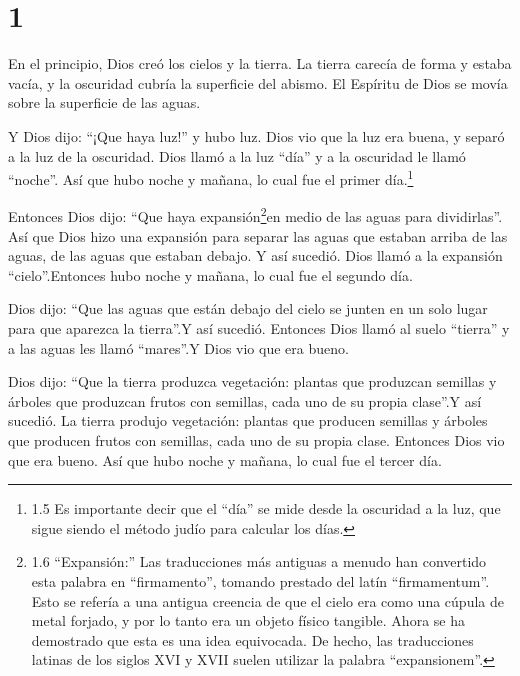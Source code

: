 \hypertarget{section}{%
\section{1}\label{section}}

 En el principio, Dios creó los cielos y la tierra.
 La tierra carecía de forma y estaba vacía, y la oscuridad
cubría la superficie del abismo. El Espíritu de Dios se movía sobre la
superficie de las aguas.

 Y Dios dijo: ``¡Que haya luz!'' y hubo luz. 
Dios vio que la luz era buena, y separó a la luz de la oscuridad.
 Dios llamó a la luz ``día'' y a la oscuridad le llamó
``noche''. Así que hubo noche y mañana, lo cual fue el primer
día.\footnote{1.5 Es importante decir que el ``día'' se mide desde la
  oscuridad a la luz, que sigue siendo el método judío para calcular los
  días.}

 Entonces Dios dijo: ``Que haya expansión\footnote{1.6
  ``Expansión:'' Las traducciones más antiguas a menudo han convertido
  esta palabra en ``firmamento'', tomando prestado del latín
  ``firmamentum''. Esto se refería a una antigua creencia de que el
  cielo era como una cúpula de metal forjado, y por lo tanto era un
  objeto físico tangible. Ahora se ha demostrado que esta es una idea
  equivocada. De hecho, las traducciones latinas de los siglos XVI y
  XVII suelen utilizar la palabra ``expansionem''.}en medio de las aguas
para dividirlas''.  Así que Dios hizo una expansión para
separar las aguas que estaban arriba de las aguas, de las aguas que
estaban debajo. Y así sucedió.  Dios llamó a la expansión
``cielo''.Entonces hubo noche y mañana, lo cual fue el segundo día.

 Dios dijo: ``Que las aguas que están debajo del cielo se
junten en un solo lugar para que aparezca la tierra''.Y así sucedió.
 Entonces Dios llamó al suelo ``tierra'' y a las aguas les
llamó ``mares''.Y Dios vio que era bueno.

 Dios dijo: ``Que la tierra produzca vegetación: plantas
que produzcan semillas y árboles que produzcan frutos con semillas, cada
uno de su propia clase''.Y así sucedió.  La tierra produjo
vegetación: plantas que producen semillas y árboles que producen frutos
con semillas, cada uno de su propia clase. Entonces Dios vio que era
bueno.  Así que hubo noche y mañana, lo cual fue el tercer
día.

